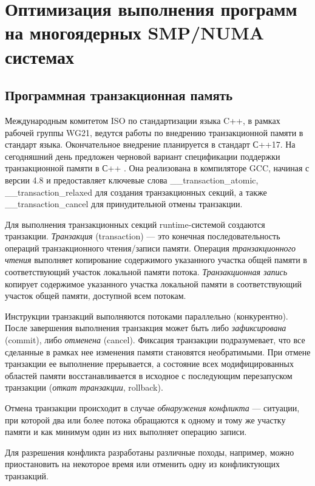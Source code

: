 \chapter{Оптимизация выполнения программ на многоядерных SMP/NUMA системах} 
\label{part3}
\section{Программная транзакционная память}
Международным комитетом ISO по стандартизации языка C++, в рамках рабочей группы 
WG21, ведутся работы по внедрению транзакционной памяти в стандарт языка. 
Окончательное внедрение планируется в стандарт С++17. На сегодняшний день 
предложен черновой вариант спецификации поддержки транзакционной памяти в С++ 
\cite{luchango_maurer_moir}. Она реализована в компиляторе GCC, начиная с версии 
4.8 и предоставляет ключевые слова \_\_transaction\_atomic, 
\_\_transaction\_relaxed для создания транзакционных секций, а также 
\_\_transaction\_cancel для принудительной отмены транзакции. 

Для выполнения транзакционных секций runtime-системой создаются транзакции. 
\textit{Транзакция} (transaction) --- это конечная последовательность операций 
транзакционного чтения/записи памяти. Операция \textit{транзакционного чтения} 
выполняет копирование содержимого указанного участка общей памяти в 
соответствующий участок локальной памяти потока. \textit{Транзакционная запись} 
копирует содержимое указанного участка локальной памяти в соответствующий 
участок общей памяти, доступной всем потокам.

Инструкции транзакций выполняются потоками параллельно (конкурентно). После 
завершения выполнения транзакция может быть либо \textit{зафиксирована} 
(commit), либо \textit{отменена} (cancel). Фиксация транзакции подразумевает, 
что все сделанные в рамках нее изменения памяти становятся необратимыми. При 
отмене транзакции ее выполнение прерывается, а состояние всех модифицированных 
областей памяти восстанавливается в исходное с последующим перезапуском 
транзакции (\textit{откат транзакции}, rollback).

Отмена транзакции происходит в случае \textit{обнаружения конфликта} --- 
ситуации, при которой два или более потока обращаются к одному и тому же участку 
памяти и как минимум один из них выполняет операцию записи.

Для разрешения конфликта разработаны различные походы, например, можно 
приостановить на некоторое время или отменить одну из конфликтующих транзакций.

